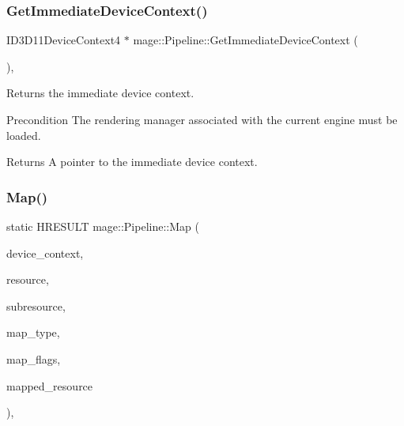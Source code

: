 \subsubsection{\texorpdfstring{Get\+Immediate\+Device\+Context()}{GetImmediateDeviceContext()}}
{\footnotesize\ttfamily I\+D3\+D11\+Device\+Context4 $\ast$ mage\+::\+Pipeline\+::\+Get\+Immediate\+Device\+Context (\begin{DoxyParamCaption}{ }\end{DoxyParamCaption})\hspace{0.3cm}{\ttfamily [static]}, {\ttfamily [noexcept]}}

Returns the immediate device context.

\begin{DoxyPrecond}{Precondition}
The rendering manager associated with the current engine must be loaded. 
\end{DoxyPrecond}
\begin{DoxyReturn}{Returns}
A pointer to the immediate device context. 
\end{DoxyReturn}
\hypertarget{structmage_1_1_pipeline_a5cc20781443e8b188181903f57008622}{}\label{structmage_1_1_pipeline_a5cc20781443e8b188181903f57008622} 
\subsubsection{\texorpdfstring{Map()}{Map()}}
{\footnotesize\ttfamily static H\+R\+E\+S\+U\+LT mage\+::\+Pipeline\+::\+Map (\begin{DoxyParamCaption}\item[{I\+D3\+D11\+Device\+Context4 $\ast$}]{device\+\_\+context,  }\item[{I\+D3\+D11\+Resource $\ast$}]{resource,  }\item[{\hyperlink{namespacemage_a41c104c036fba3756a74e19f793eeaa1}{U32}}]{subresource,  }\item[{D3\+D11\+\_\+\+M\+AP}]{map\+\_\+type,  }\item[{\hyperlink{namespacemage_a41c104c036fba3756a74e19f793eeaa1}{U32}}]{map\+\_\+flags,  }\item[{D3\+D11\+\_\+\+M\+A\+P\+P\+E\+D\+\_\+\+S\+U\+B\+R\+E\+S\+O\+U\+R\+CE $\ast$}]{mapped\+\_\+resource }\end{DoxyParamCaption})\hspace{0.3cm}{\ttfamily [static]}, {\ttfamily [noexcept]}}

\hypertarget{structmage_1_1_pipeline_a8d88f7c1e6e436c55fc7947334efaa9e}{}\label{structmage_1_1_pipeline_a8d88f7c1e6e436c55fc7947334efaa9e} 
